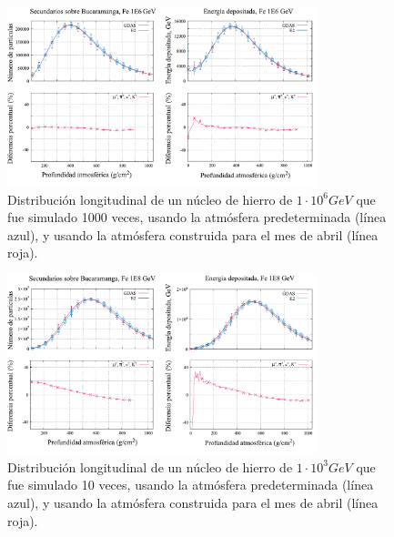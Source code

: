 \begin{figure}[htb!]
\centering
\includegraphics[width=0.8\textwidth]{images/fe_1E6.pdf}
\caption[Distribución longitudinal de un núcleo de hierro de $1\cdot 10^{6}$ GeV.]{Distribución longitudinal de un núcleo de hierro de $1\cdot 10^{6} GeV$ que fue simulado 1000 veces, usando la atmósfera predeterminada (línea azul), y usando la atmósfera construida para el mes de abril (línea roja). }
\label{fig:fig28}
\end{figure}

\begin{figure}[htb!]
\centering
\includegraphics[width=0.8\textwidth]{images/fe_1E8.pdf}
\caption[Distribución longitudinal de un núcleo de hierro de $1\cdot 10^{8}$ GeV.]{Distribución longitudinal de un núcleo de hierro de $1\cdot 10^{3} GeV$ que fue simulado 10 veces, usando la atmósfera predeterminada (línea azul), y usando la atmósfera construida para el mes de abril (línea roja). }
\label{fig:fig29}
\end{figure}

